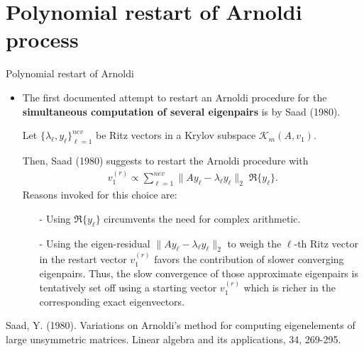 \documentclass[t,usepdftitle=false]{beamer}
\begin{document}
\section{Polynomial restart of Arnoldi process}
\begin{frame}{Polynomial restart of Arnoldi}
\begin{itemize}
\item The first documented attempt to restart an Arnoldi procedure for the \textbf{simultaneous computation of several eigenpairs} is by Saad (1980).
\item[] Let $\{\lambda_\ell,y_\ell\}_{\ell=1}^{nev}$ be Ritz vectors in a Krylov subspace $\mathcal{K}_{m}(A,v_1)$.
\item[] Then, Saad (1980) suggests to restart the Arnoldi procedure with 
\begin{align*}
v_1^{(r)}\propto
\sum_{\ell=1}^{nev}\|Ay_\ell-\lambda_\ell y_\ell\|_2\;\Re\{y_\ell\}.
\end{align*}
Reasons invoked for this choice are:
\begin{itemize}\normalsize
\item[-] Using $\Re\{y_\ell\}$ circumvents the need for complex arithmetic.
\item[-] Using the eigen-residual $\|Ay_\ell-\lambda_\ell y_\ell\|_2$ to weigh the $\ell$-th Ritz vector in the restart vector $v_1^{(r)}$ favors the contribution of slower converging eigenpairs.
Thus, the slow convergence of those approximate eigenpairs is tentatively set off using a starting vector $v_1^{(r)}$ which is richer in the corresponding exact eigenvectors.
\end{itemize}
\smallskip
\end{itemize}
\tiny{Saad, Y. (1980). Variations on Arnoldi's method for computing eigenelements of large unsymmetric matrices. Linear algebra and its applications, 34, 269-295.}
\end{frame}
\end{document}
